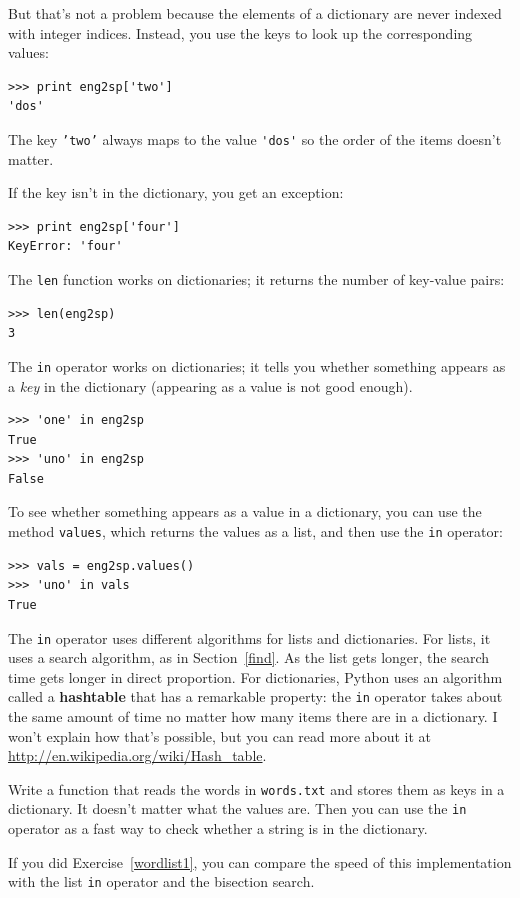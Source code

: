 \documentclass[10pt]{book}
\begin{document}
But that's not a problem because
the elements of a dictionary are never indexed with integer indices.
Instead, you use the keys to look up the corresponding values:

\begin{verbatim}
>>> print eng2sp['two']
'dos'
\end{verbatim}
%
The key {\tt 'two'} always maps to the value \verb"'dos'" so the order
of the items doesn't matter.

If the key isn't in the dictionary, you get an exception:

\begin{verbatim}
>>> print eng2sp['four']
KeyError: 'four'
\end{verbatim}
%
The {\tt len} function works on dictionaries; it returns the
number of key-value pairs:

\begin{verbatim}
>>> len(eng2sp)
3
\end{verbatim}
%
The {\tt in} operator works on dictionaries; it tells you whether
something appears as a {\em key} in the dictionary (appearing
as a value is not good enough).

\begin{verbatim}
>>> 'one' in eng2sp
True
>>> 'uno' in eng2sp
False
\end{verbatim}
%
To see whether something appears as a value in a dictionary, you
can use the method {\tt values}, which returns the values as
a list, and then use the {\tt in} operator:

\begin{verbatim}
>>> vals = eng2sp.values()
>>> 'uno' in vals
True
\end{verbatim}
%
The {\tt in} operator uses different algorithms for lists and
dictionaries.  For lists, it uses a search algorithm, as in
Section~\ref{find}.  As the list gets longer, the search time gets
longer in direct proportion.  For dictionaries, Python uses an
algorithm called a {\bf hashtable} that has a remarkable property: the
{\tt in} operator takes about the same amount of time no matter how
many items there are in a dictionary.  I won't explain how that's
possible, but you can read more about it at
\url{http://en.wikipedia.org/wiki/Hash_table}.

\begin{exercise}
\label{wordlist2}

Write a function that reads the words in {\tt words.txt} and
stores them as keys in a dictionary.  It doesn't matter what the
values are.  Then you can use the {\tt in} operator
as a fast way to check whether a string is in
the dictionary.

If you did Exercise~\ref{wordlist1}, you can compare the speed
of this implementation with the list {\tt in} operator and the
bisection search.

\end{exercise}
\end{document}
